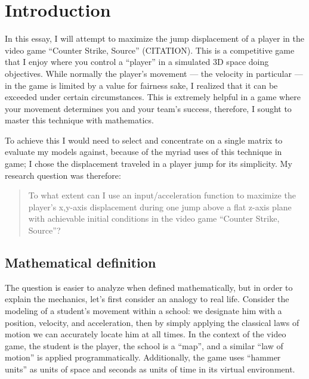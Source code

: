 \section{Introduction}


In this essay, I will attempt to maximize the jump displacement of a player in the video game ``Counter Strike, Source'' (CITATION). This is a competitive game that I enjoy where you control a ``player'' in a simulated 3D space doing objectives. While normally the player's movement --- the velocity in particular --- in the game is limited by a value for fairness sake, I realized that it can be exceeded under certain circumstances. This is extremely helpful in a game where your movement determines you and your team's success, therefore, I sought to master this technique with mathematics.


To achieve this I would need to select and concentrate on a single matrix to evaluate my models against, because of the myriad uses of this technique in game; I chose the displacement traveled in a player jump for its simplicity. My research question was therefore:
\begin{quote}
    To what extent can I use an input/acceleration function to maximize the player's x,y-axis displacement during one jump above a flat z-axis plane with achievable initial conditions in the video game ``Counter Strike, Source''?
\end{quote}

\subsection{Mathematical definition}
The question is easier to analyze when defined mathematically, but in order to explain the mechanics, let's first consider an analogy to real life. Consider the modeling of a student's movement within a school: we designate him with a position, velocity, and acceleration, then by simply applying the classical laws of motion we can accurately locate him at all times. In the context of the video game, the student is the player, the school is a ``map'', and a similar ``law of motion'' is applied programmatically. Additionally, the game uses ``hammer units'' as units of space and seconds as units of time in its virtual environment.


